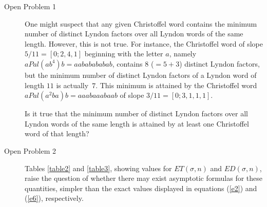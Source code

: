 \documentclass[11pt]{amsart}
\newcommand{\1}{\bar{1}}
\theoremstyle{plain}
\theoremstyle{definition}
\theoremstyle{remark}
\begin{document}
\begin{description}
\item[Open Problem 1] One might suspect that any given Christoffel word contains the minimum number of distinct Lyndon factors over all Lyndon words of the same length. However, this is not true. For instance, the Christoffel word of slope $5/11=[0;2,4,1]$ beginning with the letter $a$, namely $aPal(ab^4)b = aababababab$, contains $8$ ($= 5 + 3$) distinct Lyndon factors, but the minimum number of distinct Lyndon factors of a Lyndon word of length $11$ is actually~$7$. This minimum is attained by the Christoffel word $aPal(a^2ba)b = aaabaaabaab$ of slope $3/11=[0;3,1,1,1]$.

Is it true that the minimum number of distinct Lyndon factors over all Lyndon words of the same length is attained by at least one Christoffel word of that length?

\item[Open Problem 2] Tables \ref{table2} and \ref{table3}, showing values for $ET(\sigma,n)$ and $ED(\sigma,n)$, raise the question of whether there may exist asymptotic formulas for these quantities, simpler than the exact values displayed in equations (\ref{e2}) and (\ref{e6}), respectively.
\end{description}
\end{document}
